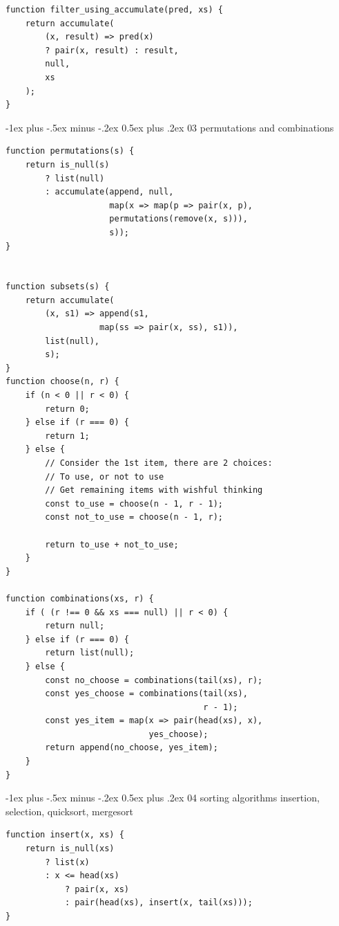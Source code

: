 \documentclass[10pt, landscape]{article}
\makeatletter
\renewcommand{\section}{\@startsection{section}{1}{0mm}%
                                {-1ex plus -.5ex minus -.2ex}%
                                {0.5ex plus .2ex}%
                                {\normalfont\large\bfseries}}
\makeatother
\begin{document}
\begin{multicols}{4}
\begin{verbatim}
function filter_using_accumulate(pred, xs) {
    return accumulate(
        (x, result) => pred(x) 
        ? pair(x, result) : result,
        null,
        xs
    );
}
\end{verbatim}

\section{03 permutations and combinations}
\begin{verbatim}
function permutations(s) {
    return is_null(s)
        ? list(null)
        : accumulate(append, null,
                     map(x => map(p => pair(x, p),
                     permutations(remove(x, s))),
                     s));
}


function subsets(s) {
    return accumulate(
        (x, s1) => append(s1,
                   map(ss => pair(x, ss), s1)),
        list(null),
        s);
}
function choose(n, r) {
    if (n < 0 || r < 0) {
        return 0;
    } else if (r === 0) {
        return 1;
    } else {
        // Consider the 1st item, there are 2 choices:
        // To use, or not to use
        // Get remaining items with wishful thinking
        const to_use = choose(n - 1, r - 1);
        const not_to_use = choose(n - 1, r);
        
        return to_use + not_to_use;
    }
}

function combinations(xs, r) {
    if ( (r !== 0 && xs === null) || r < 0) {
        return null;
    } else if (r === 0) {
        return list(null);
    } else {
        const no_choose = combinations(tail(xs), r);
        const yes_choose = combinations(tail(xs),
                                        r - 1);
        const yes_item = map(x => pair(head(xs), x),
                             yes_choose);
        return append(no_choose, yes_item);
    }
}
\end{verbatim}

\section{04 sorting algorithms}
insertion, selection, quicksort, mergesort
\begin{verbatim}
function insert(x, xs) {
    return is_null(xs)
        ? list(x)
        : x <= head(xs)
            ? pair(x, xs)
            : pair(head(xs), insert(x, tail(xs)));
}


\end{verbatim}
\end{multicols}
\end{document}
